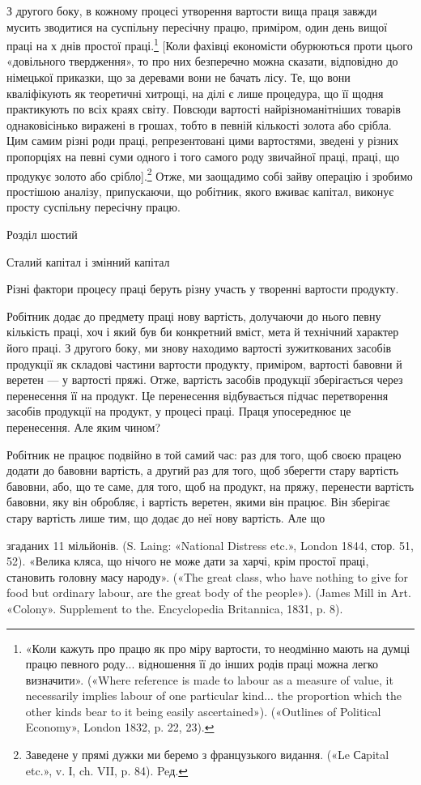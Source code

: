 З    другого боку, в кожному процесі утворення вартости вища
праця завжди мусить зводитися на суспільну пересічну працю,
приміром, один день вищої праці на х днів простої праці.\footnote{
«Коли кажуть про працю як про міру вартости, то неодмінно мають
на думці працю певного роду... відношення її до інших родів праці можна
легко визначити». («Where reference is made to labour as a measure of
value, it necessarily implies labour of one particular kind... the proportion
which the other kinds bear to it being easily ascertained»). («Outlines of
Political Economy», London 1832, p. 22, 23).
} [Коли
фахівці економісти обурюються проти цього «довільного твердження»,
то про них безперечно можна сказати, відповідно до
німецької приказки, що за деревами вони не бачать лісу. Те, що
вони кваліфікують як теоретичні хитрощі, на ділі є лише процедура,
що її щодня практикують по всіх краях світу. Повсюди
вартості найрізноманітніших товарів однаковісінько виражені
в грошах, тобто в певній кількості золота або срібла. Цим самим
різні роди праці, репрезентовані цими вартостями, зведені у
різних пропорціях на певні суми одного і того самого роду звичайної
праці, праці, що продукує золото або срібло].\footnote*{
Заведене у прямі дужки ми беремо з французького видання. («Le Саpital
etc.», v. І, ch. VII, p. 84). Peд.
} Отже,
ми заощадимо собі зайву операцію і зробимо простішою аналізу,
припускаючи, що робітник, якого вживає капітал, виконує
просту суспільну пересічну працю.

Розділ шостий

Сталий капітал і змінний капітал

Різні фактори процесу праці беруть різну участь у творенні
вартости продукту.

Робітник додає до предмету праці нову вартість, долучаючи
до нього певну кількість праці, хоч і який був би конкретний
вміст, мета й технічний характер його праці. З другого боку, ми
знову находимо вартості зужиткованих засобів продукції як
складові частини вартости продукту, приміром, вартості бавовни
й веретен — у вартості пряжі. Отже, вартість засобів продукції
зберігається через перенесення її на продукт. Це перенесення
відбувається підчас перетворення засобів продукції на продукт,
у процесі праці. Праця упосереднює це перенесення. Але яким
чином?

Робітник не працює подвійно в той самий час: раз для того,
щоб своєю працею додати до бавовни вартість, а другий раз для
того, щоб зберегти стару вартість бавовни, або, що те саме, для
того, щоб на продукт, на пряжу, перенести вартість бавовни, яку
він обробляє, і вартість веретен, якими він працює. Він зберігає
стару вартість лише тим, що додає до неї нову вартість. Але що

згаданих 11 мільйонів. (S. Laing: «National Distress etc.», London
1844, стор. 51, 52). «Велика кляса, що нічого не може дати за харчі,
крім простої праці, становить головну масу народу». («The great class,
who have nothing to give for food but ordinary labour, are the great body
of the people»). (James Mill in Art. «Colony». Supplement to the. Encyclopedia
Britannica, 1831, p. 8).
\parbreak{}  %

